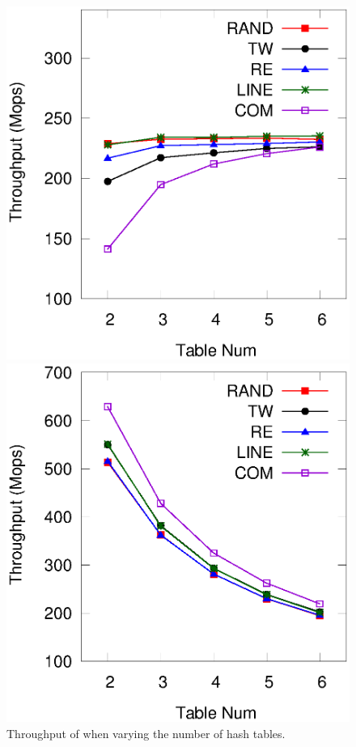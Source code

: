 \begin{figure}[t]
	\begin{minipage}{0.48\linewidth}\centering
		\includegraphics[width=\linewidth]{pic/tunning/tunning-insert.eps}
		\centerline{}
	\end{minipage}
	\hfill
	\begin{minipage}{0.48\linewidth}\centering
		\includegraphics[width=\linewidth]{pic/tunning/tunning-search.eps}
		\centerline{}
	\end{minipage}
	\caption{Throughput of \voter when varying the number of hash tables.}
	\label{fig:vary-table}
\end{figure}
